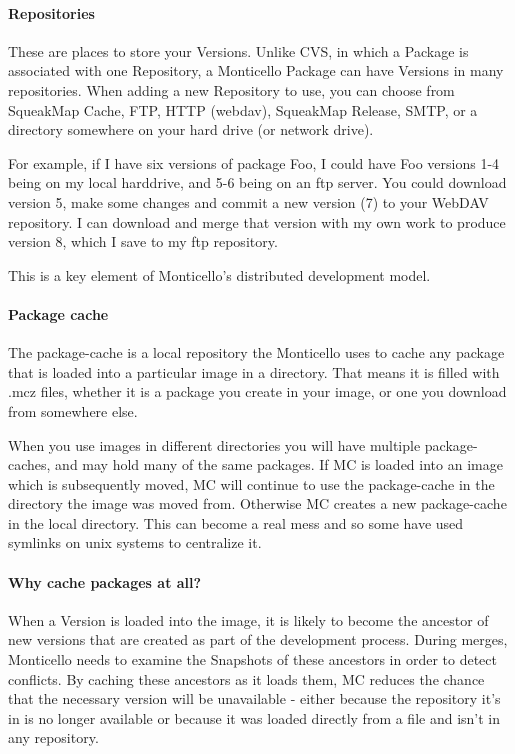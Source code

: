 \documentclass[a4paper,10pt,twoside]{book}
\begin{document}
\paragraph{Repositories}

These are places to store your Versions. Unlike CVS, in which a Package is associated with one Repository, a Monticello Package can have Versions in many repositories. When adding a new Repository to use, you can choose from SqueakMap Cache, FTP, HTTP (webdav), SqueakMap Release, SMTP, or a directory somewhere on your hard drive (or network drive).

For example, if I have six versions of package Foo, I could have Foo versions 1-4 being on my local harddrive, and 5-6 being on an ftp server. You could download version 5, make some changes and commit a new version (7) to your WebDAV repository. I can download and merge that version with my own work to produce version 8, which I save to my ftp repository.

This is a key element of Monticello's distributed development model.

\paragraph{Package cache}

The package-cache is a local repository the Monticello uses to cache any package that is loaded into a particular image in a directory. That means it is filled with .mcz files, whether it is a package you create in your image, or one you download from somewhere else.

When you use images in different directories you will have multiple package-caches, and may hold many of the same packages. If MC is loaded into an image which is subsequently moved, MC will continue to use the package-cache in the directory the image was moved from. Otherwise MC creates a new package-cache in the local directory. This can become a real mess and so some have used symlinks on unix systems to centralize it.

\paragraph{Why cache packages at all?}

When a Version is loaded into the image, it is likely to become the ancestor of new versions that are created as part of the development process. During merges, Monticello needs to examine the Snapshots of these ancestors in order to detect conflicts. By caching these ancestors as it loads them, MC reduces the chance that the necessary version will be unavailable - either because the repository it's in is no longer available or because it was loaded directly from a file and isn't in any repository.
\end{document}

